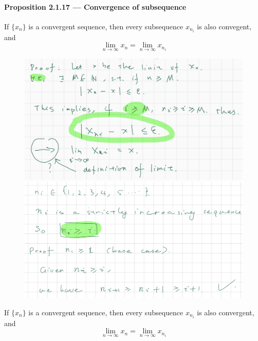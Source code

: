 \documentclass{article}
\begin{document}
\paragraph{Proposition 2.1.17 — Convergence of subsequence}
If $\{x_n\}$ is a convergent sequence, then every subsequence $x_{n_i}$ is also convegent, and $$\lim_{n\to \infty}x_n=\lim_{n\to \infty}x_{n_i}$$
\begin{figure}[H]
    \centering
    \includegraphics{0126}
    \includegraphics{0127}
\end{figure}
If $\{x_n\}$ is a convergent sequence, then every subsequence $x_{n_i}$ is also convergent, and $$\lim_{n\to \infty}x_n=\lim_{n\to \infty}x_{n_i}$$
\end{document}
